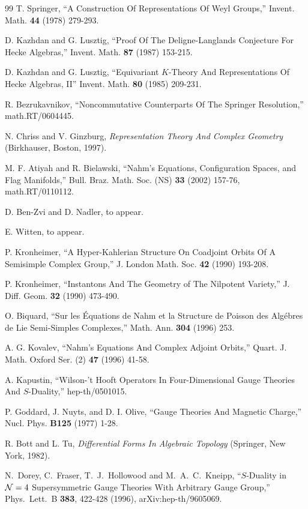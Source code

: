 \begin{thebibliography}{99}
 T. Springer,  ``A
Construction Of Representations Of Weyl Groups,''
Invent. Math. {\bf 44} (1978) 279-293.

 D. Kazhdan and G. Lusztig, ``Proof Of The Deligne-Langlands Conjecture For Hecke
Algebras,'' Invent. Math. {\bf 87} (1987) 153-215.

 D. Kazhdan and G. Lusztig, ``Equivariant $K$-Theory And Representations Of Hecke
Algebras, II'' Invent. Math. {\bf 80} (1985) 209-231.

 R.
Bezrukavnikov, ``Noncommutative Counterparts Of The Springer Resolution,''
math.RT/0604445.

 N.
Chriss and V. Ginzburg, {\it Representation Theory And Complex Geometry} (Birkhauser, Boston,
1997).

 M. F. Atiyah and R. Bielawski, ``Nahm's Equations, Configuration
Spaces, and Flag Manifolds,'' Bull. Braz. Math. Soc. (NS) {\bf 33} (2002) 157-76,
math.RT/0110112.

 D. Ben-Zvi and D. Nadler, to
appear.

 E. Witten, to appear.

 P. Kronheimer, ``A Hyper-Kahlerian Structure
On Coadjoint Orbits Of A Semisimple Complex Group,'' J. London Math. Soc. {\bf 42} (1990)
193-208.

 P. Kronheimer, ``Instantons And The Geometry of The Nilpotent Variety,''
J. Diff. Geom. {\bf 32} (1990) 473-490.

 O. Biquard, ``Sur les \'Equations de Nahm et la Structure de Poisson des Alg\'ebres
de Lie Semi-Simples Complexes,'' Math. Ann. {\bf 304} (1996) 253.

 A. G. Kovalev, ``Nahm's Equations And Complex Adjoint Orbits,'' Quart. J. Math.
Oxford Ser. (2) {\bf 47} (1996) 41-58.

 A. Kapustin,
``Wilson-'t Hooft Operators In Four-Dimensional Gauge Theories
And $S$-Duality,'' hep-th/0501015.

 P. Goddard, J. Nuyts, and D. I. Olive, ``Gauge
Theories And Magnetic Charge,'' Nucl. Phys. {\bf B125} (1977)
1-28.

 R.
Bott and L. Tu, {\it Differential Forms In Algebraic Topology}
(Springer, New York, 1982).

 N.~Dorey, C.~Fraser, T.~J.~Hollowood and
M.~A.~C.~Kneipp, ``$S$-Duality in ${\mathcal{N}}=4$ Supersymmetric Gauge
Theories With Arbitrary Gauge Group,'' Phys.\ Lett.\ B {\bf 383},
422-428 (1996), arXiv:hep-th/9605069.


\end{thebibliography}
